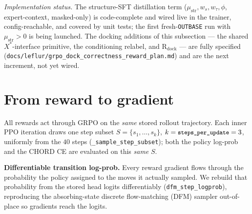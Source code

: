 \documentclass[11pt]{article}
\newcommand{\R}{\mathrm{R}}
\newcommand{\ttk}[1]{\texttt{\small #1}}
\begin{document}
\emph{Implementation status.} The structure-SFT distillation term
($\mu_{\text{str}},w_s,w_\tau,\phi$, expert-context, masked-only) is code-complete and wired live in
the trainer, config-reachable, and covered by unit tests; the first fresh-\ttk{OUTBASE} run with
$\mu_{\text{str}}{>}0$ is being launched. The docking additions of this subsection --- the shared
$X^{\ast}$-interface primitive, the conditioning relabel, and $\R_{\mathrm{dock}}$ --- are fully
specified (\ttk{docs/leflur/grpo\_dock\_correctness\_reward\_plan.md}) and are the next increment,
not yet wired.

\section{From reward to gradient}
\label{sec:reward2grad}
All rewards act through GRPO on the \emph{same} stored rollout trajectory. Each inner PPO
iteration draws one step subset $S=\{s_1,\dots,s_k\}$, $k=\ttk{steps\_per\_update}=3$, uniformly
from the $40$ steps (\ttk{\_sample\_step\_subset}); both the policy log-prob and the CHORD CE are
evaluated on this \emph{same} $S$.

\textbf{Differentiable transition log-prob.} Every reward gradient flows through the probability the
policy assigned to the moves it actually sampled. We rebuild that probability from the stored head
logits differentiably (\ttk{dfm\_step\_logprob}), reproducing the absorbing-state discrete
flow-matching (DFM) sampler out-of-place so gradients reach the logits.
\end{document}
